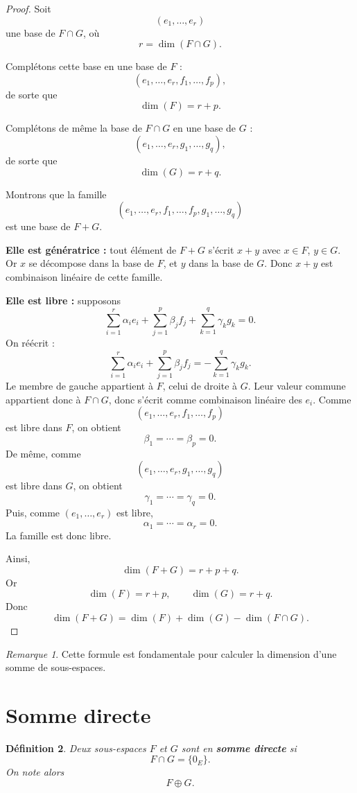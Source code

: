 \documentclass[11pt,a4paper]{article}
\newtheorem{definition}{Définition}[section]
\theoremstyle{remark}
\newtheorem{remarque}[definition]{Remarque}
\begin{document}
\begin{proof}
Soit
\[
(e_1,\dots,e_r)
\]
une base de \(F\cap G\), où
\[
r=\dim(F\cap G).
\]

Complétons cette base en une base de \(F\) :
\[
(e_1,\dots,e_r,f_1,\dots,f_p),
\]
de sorte que
\[
\dim(F)=r+p.
\]

Complétons de même la base de \(F\cap G\) en une base de \(G\) :
\[
(e_1,\dots,e_r,g_1,\dots,g_q),
\]
de sorte que
\[
\dim(G)=r+q.
\]

Montrons que la famille
\[
(e_1,\dots,e_r,f_1,\dots,f_p,g_1,\dots,g_q)
\]
est une base de \(F+G\).

\textbf{Elle est génératrice :} tout élément de \(F+G\) s’écrit \(x+y\) avec \(x\in F\), \(y\in G\). Or \(x\) se décompose dans la base de \(F\), et \(y\) dans la base de \(G\). Donc \(x+y\) est combinaison linéaire de cette famille.

\textbf{Elle est libre :} supposons
\[
\sum_{i=1}^r \alpha_i e_i+\sum_{j=1}^p \beta_j f_j+\sum_{k=1}^q \gamma_k g_k=0.
\]
On réécrit :
\[
\sum_{i=1}^r \alpha_i e_i+\sum_{j=1}^p \beta_j f_j
=
-\sum_{k=1}^q \gamma_k g_k.
\]
Le membre de gauche appartient à \(F\), celui de droite à \(G\). Leur valeur commune appartient donc à \(F\cap G\), donc s’écrit comme combinaison linéaire des \(e_i\). Comme
\[
(e_1,\dots,e_r,f_1,\dots,f_p)
\]
est libre dans \(F\), on obtient
\[
\beta_1=\cdots=\beta_p=0.
\]
De même, comme
\[
(e_1,\dots,e_r,g_1,\dots,g_q)
\]
est libre dans \(G\), on obtient
\[
\gamma_1=\cdots=\gamma_q=0.
\]
Puis, comme \((e_1,\dots,e_r)\) est libre,
\[
\alpha_1=\cdots=\alpha_r=0.
\]
La famille est donc libre.

Ainsi,
\[
\dim(F+G)=r+p+q.
\]
Or
\[
\dim(F)=r+p,\qquad \dim(G)=r+q.
\]
Donc
\[
\dim(F+G)=\dim(F)+\dim(G)-\dim(F\cap G).
\]
\end{proof}

\begin{remarque}
Cette formule est fondamentale pour calculer la dimension d’une somme de sous-espaces.
\end{remarque}

\section{Somme directe}

\begin{definition}
Deux sous-espaces \(F\) et \(G\) sont en \textbf{somme directe} si
\[
F\cap G=\{0_E\}.
\]
On note alors
\[
F\oplus G.
\]
\end{definition}
\end{document}
